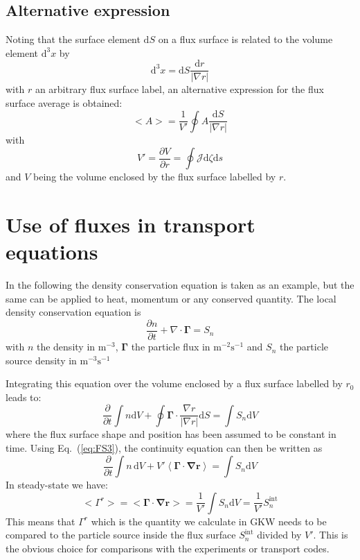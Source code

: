 \subsection{Alternative expression}
Noting that the surface element $\textrm{d} S$ on a flux surface is related to the volume element 
$\textrm{d}^3x$ by
\begin{equation}
 \textrm{d}^3x = \textrm{d} S \frac{\textrm{d}r}{|\nabla r|}
\end{equation}
with $r$ an arbitrary flux surface label, an alternative expression for the flux surface average is obtained:
\begin{equation} \label{eq:FS3}
 <A> = \frac{1}{V'} \oint A \frac{\textrm{d}S}{|\nabla r|}
\end{equation}
with 
\begin{equation}
 V'= \frac{\partial V}{\partial r} = \oint \mathcal{J} \textrm{d}\zeta \textrm{d}s
\end{equation}
and $V$ being the volume enclosed by the flux surface labelled by $r$.


\section{Use of fluxes in transport equations \label{sec.transport}}
In the following the density conservation equation is taken as an example, but the same can be applied to heat, momentum or any
conserved quantity.
The local density conservation equation is 
\begin{equation}
 \frac{\partial n}{\partial t} + \nabla \cdot \mathbf{\Gamma} = S_n
\end{equation}
with $n$ the density in $\textrm{m}^{-3}$, $\mathbf{\Gamma}$ the particle flux in $\textrm{m}^{-2}\textrm{s}^{-1}$ and $S_n$ the particle source density
in $\textrm{m}^{-3}\textrm{s}^{-1}$

Integrating this equation over the volume enclosed by a flux surface labelled by $r_0$ leads to:
\begin{equation}
 \frac{\partial }{\partial t} \int n \textrm{d}V + \oint \mathbf{\Gamma}\cdot\frac{\nabla r}{|\nabla r|} \textrm{d}S = 
\int S_n \textrm{d} V
\end{equation}
where the flux surface shape and position has been assumed to be constant in time. 
Using Eq.~(\ref{eq:FS3}), the continuity equation can then be written as
\begin{equation}
 \frac{\partial }{\partial t} \int n \,\textrm{d}V + V'\left<\mathbf{\Gamma\cdot\nabla r}\right> = 
\int S_n \textrm{d}V
\end{equation}
In steady-state we have:
\begin{equation}
 <\Gamma^r>=<\mathbf{\Gamma\cdot\nabla r}> = \frac{1}{V'}\int S_n \textrm{d}V = \frac{1}{V'}S^\textrm{int}_n
\end{equation}
This means that $\Gamma^r$ which is the quantity we calculate in GKW needs to be compared to the particle source inside the flux 
surface $S^\textrm{int}_n$ divided by $V'$. This is the obvious choice for comparisons with the experiments or transport codes.


